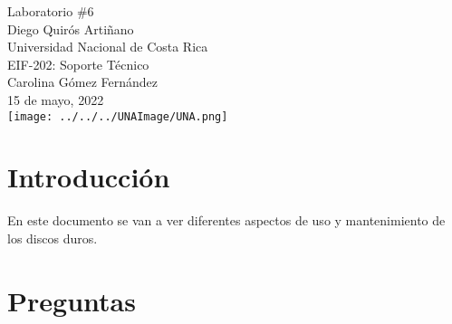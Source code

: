 \documentclass[stu, 12pt, letterpaper, donotrepeattitle, floatsintext, natbib, helv]{apa7}
\begin{document}
\begin{titlepage}
    \centering
    \vfill
    \LARGE Laboratorio \#6\\
    \vskip2cm
    \large Diego Quirós Artiñano \\
    Universidad Nacional de Costa Rica \\
    EIF-202: Soporte Técnico \\ 
    Carolina Gómez Fernández \\
    15 de mayo, 2022 \\
    \vfill
    \texttt{[image: ../../../UNAImage/UNA.png]} \\
    \vfill
    \vfill
\end{titlepage}

\addto{}
\tableofcontents
\setcounter{tocdepth}{2}
\newpage


\section*{Introducción}
{}
En este documento se van a ver diferentes aspectos de uso y mantenimiento de los discos duros.
\section*{Preguntas}
{}
\end{document}
